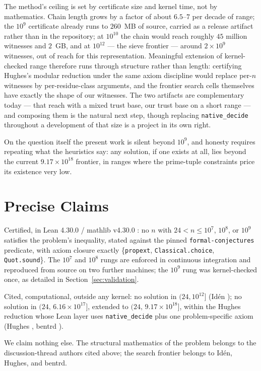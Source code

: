\documentclass[11pt]{article}
\newcommand{\lean}[1]{\texttt{#1}}
\begin{document}
The method's ceiling is set by certificate size and kernel time, not by
mathematics. Chain length grows by a factor of about $6.5$--$7$ per
decade of range; the $10^9$ certificate already runs to $260$~MB of
source, carried as a release artifact rather than in the repository; at
$10^{10}$ the chain would reach roughly $45$ million witnesses and
$2$~GB, and at $10^{12}$ --- the sieve frontier --- around
$2 \times 10^9$ witnesses, out of reach for this representation.
Meaningful extension of kernel-checked range therefore runs through
structure rather than length: certifying Hughes's modular reduction
under the same axiom discipline would replace per-$n$ witnesses by
per-residue-class arguments, and the frontier search cells themselves
have exactly the shape of our witnesses. The two artifacts are
complementary today --- that reach with a mixed trust base, our trust
base on a short range --- and composing them is the natural next step,
though replacing \lean{native\_decide} throughout a development of that
size is a project in its own right.

On the question itself the present work is silent beyond $10^9$, and
honesty requires repeating what the heuristics say: any solution, if
one exists at all, lies beyond the current $9.17 \times 10^{18}$
frontier, in ranges where the prime-tuple constraints price its
existence very low.

\section{Precise Claims}\label{sec:claims}

Certified, in Lean 4.30.0 / mathlib v4.30.0 \cite{decanus}: no $n$
with $24 < n \le 10^7$, $10^8$, or $10^9$ satisfies the problem's
inequality, stated against the pinned \lean{formal-conjectures}
predicate, with axiom closure exactly \{\lean{propext},
\lean{Classical.choice}, \lean{Quot.sound}\}. The $10^7$ and $10^8$
rungs are enforced in continuous integration and reproduced from source
on two further machines; the $10^9$ rung was kernel-checked once, as
detailed in Section~\ref{sec:validation}.

Cited, computational, outside any kernel: no solution in
$(24, 10^{12}]$ (Id\'en \cite{iden}); no solution in
$(24,\, 6.16 \times 10^{17}]$, extended to
$(24,\, 9.17 \times 10^{18}]$, within the Hughes reduction whose Lean
layer uses \lean{native\_decide} plus one problem-specific axiom
(Hughes \cite{hughesrepo}, bentrd \cite{bentrd}).

We claim nothing else. The structural mathematics of the problem
belongs to the discussion-thread authors cited above; the search
frontier belongs to Id\'en, Hughes, and bentrd.
\end{document}
